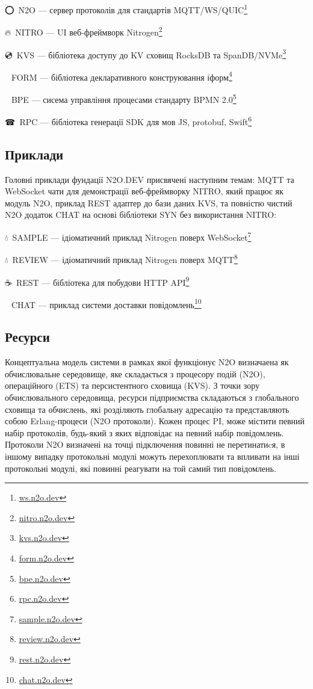 \setmainfont{Segoe UI Emoji}⭕\setmainfont{Geometria}\ N2O --- сервер протоколів для стандартів MQTT/WS/QUIC\footnote{\url{ws.n2o.dev}}

\setmainfont{Segoe UI Emoji}🔥\setmainfont{Geometria}\ NITRO --- UI веб-фреймворк Nitrogen\footnote{\url{nitro.n2o.dev}}

\setmainfont{Segoe UI Emoji}💿\setmainfont{Geometria}\ KVS --- бібліотека доступу до KV сховищ RocksDB та SpanDB/NVMe\footnote{\url{kvs.n2o.dev}}

\setmainfont{Segoe UI Emoji}📜\setmainfont{Geometria}\ FORM --- бібліотека декларативного конструювання іформ\footnote{\url{form.n2o.dev}}

\setmainfont{Segoe UI Emoji}💠\setmainfont{Geometria}\ BPE --- сисема управління процесами стандарту BPMN 2.0\footnote{\url{bpe.n2o.dev}}

\setmainfont{Segoe UI Emoji}☎\setmainfont{Geometria}\ RPC --- бібліотека генерації SDK для мов JS, protobuf, Swift\footnote{\url{rpc.n2o.dev}}

\subsection{Приклади}

Головні приклади фундації N2O.DEV присвячені наступним темам: MQTT та WebSocket
чати для демонстрації веб-фреймворку NITRO, який працює як модуль N2O, приклад
REST адаптер до бази даних KVS, та повністю чистий N2O додаток CHAT на основі
бібліотеки SYN без використання NITRO:

\setmainfont{Segoe UI Emoji}💧\setmainfont{Geometria}\ SAMPLE --- ідіоматичний приклад Nitrogen поверх WebSocket\footnote{\url{sample.n2o.dev}}

\setmainfont{Segoe UI Emoji}💧\setmainfont{Geometria}\ REVIEW --- ідіоматичний приклад Nitrogen поверх MQTT\footnote{\url{review.n2o.dev}}

\setmainfont{Segoe UI Emoji}☕\setmainfont{Geometria}\ REST --- бібліотека для побудови HTTP API\footnote{\url{rest.n2o.dev}}

\setmainfont{Segoe UI Emoji}💬\setmainfont{Geometria}\ CHAT --- приклад системи доставки повідомлень\footnote{\url{chat.n2o.dev}}



\newpage
\subsection{Ресурси}

Концептуальна модель системи в рамках якої функціонує N2O визначаена як обчислювальне середовище,
яке складається з процесору подій (N2O), операційного (ETS) та персистентного сховища (KVS).
З точки зору обчислювального середовища, ресурси підприємства складаються з глобального
 сховища та обчислень, які розділяють глобальну адресацію та представляють собою
Erlang-процеси (N2O протоколи). Кожен процес PI, може містити певний набір протоколів,
будь-який з яких відповідає на певний набір повідомлень. Протоколи N2O визначені на
точці підключення повинні не перетинатиcя, в іншому випадку протокольні модулі можуть
перехоплювати та впливати на інші протокольні модулі, які повинні реагувати на той
самий тип повідомлень.

